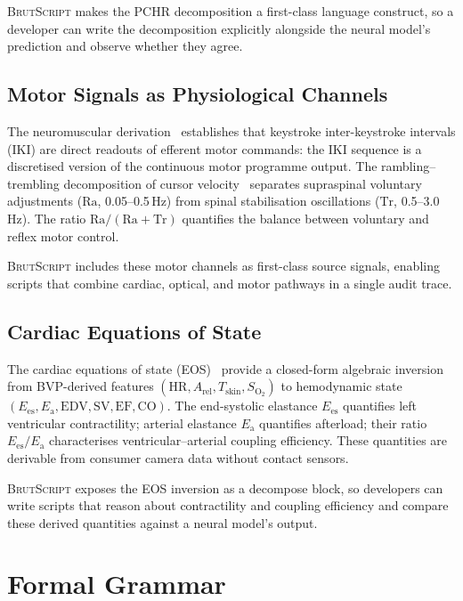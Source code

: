 \documentclass[10pt,twocolumn,a4paper]{article}
\theoremstyle{definition}
\theoremstyle{remark}
\newcommand{\BS}{\textsc{BrutScript}}
\newcommand{\Ees}{E_{\mathrm{es}}}
\newcommand{\Ea}{E_{\mathrm{a}}}
\newcommand{\EDV}{\mathrm{EDV}}
\newcommand{\EF}{\mathrm{EF}}
\newcommand{\CO}{\mathrm{CO}}
\newcommand{\SV}{\mathrm{SV}}
\newcommand{\HR}{\mathrm{HR}}
\newcommand{\Ra}{\mathrm{Ra}}
\newcommand{\Tr}{\mathrm{Tr}}
\newcommand{\Soxy}{S_{\mathrm{O_2}}}
\begin{document}
\BS{} makes the PCHR decomposition a first-class language construct,
so a developer can write the decomposition explicitly alongside the
neural model's prediction and observe whether they agree.

\subsection{Motor Signals as Physiological Channels}

The neuromuscular derivation~\cite{sachikonye2024motor} establishes that
keystroke inter-keystroke intervals (IKI) are direct readouts of efferent
motor commands: the IKI sequence is a discretised version of the
continuous motor programme output.  The rambling--trembling decomposition
of cursor velocity~\cite{sachikonye2024posture} separates supraspinal
voluntary adjustments ($\Ra$, 0.05--0.5\,Hz) from spinal stabilisation
oscillations ($\Tr$, 0.5--3.0\,Hz).  The ratio $\Ra/(\Ra+\Tr)$
quantifies the balance between voluntary and reflex motor control.

\BS{} includes these motor channels as first-class source signals,
enabling scripts that combine cardiac, optical, and motor pathways
in a single audit trace.

\subsection{Cardiac Equations of State}

The cardiac equations of state (EOS)~\cite{sachikonye2024eos} provide a
closed-form algebraic inversion from BVP-derived features
$(\HR, A_{\mathrm{rel}}, T_{\mathrm{skin}}, \Soxy)$ to hemodynamic
state $(\Ees, \Ea, \EDV, \SV, \EF, \CO)$.  The end-systolic elastance
$\Ees$ quantifies left ventricular contractility; arterial elastance
$\Ea$ quantifies afterload; their ratio $\Ees/\Ea$ characterises
ventricular--arterial coupling efficiency.  These quantities are
derivable from consumer camera data without contact sensors.

\BS{} exposes the EOS inversion as a decompose block, so developers
can write scripts that reason about contractility and coupling efficiency
and compare these derived quantities against a neural model's output.

\section{Formal Grammar}
\label{sec:grammar}
\end{document}
